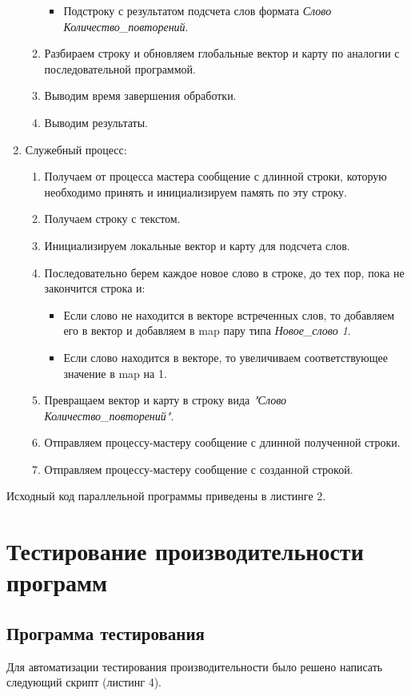 \documentclass[12pt,a4paper]{report}
\begin{document}
\begin{enumerate}
\begin{enumerate}
\begin{itemize}
										\item Подстроку с результатом подсчета слов формата \textit{Слово Количество\_повторений}.
									\end{itemize}
								\item Разбираем строку и обновляем глобальные вектор и карту по аналогии с последовательной программой.
								\item Выводим время завершения обработки.
								\item Выводим результаты.
							\end{enumerate}
						\item Служебный процесс:
							\begin{enumerate}
								\item Получаем от процесса мастера сообщение с длинной строки, которую необходимо принять и инициализируем память по эту строку.
								\item Получаем строку с текстом.
								\item Инициализируем локальные вектор и карту для подсчета слов.
								\item Последовательно берем каждое новое слово в строке, до тех пор, пока не закончится строка и:
									\begin{itemize}
										\item Если слово не находится в векторе встреченных слов, то добавляем его в вектор и добавляем в map пару типа \textit{Новое\_слово 1}.
										\item Если слово находится в векторе, то увеличиваем соответствующее значение в map на 1.
									\end{itemize}
								\item Превращаем вектор и карту в строку вида \textit{"Слово Количество\_повторений"}.
								\item Отправляем процессу-мастеру сообщение с длинной полученной строки.
								\item Отправляем процессу-мастеру сообщение с созданной строкой.
							\end{enumerate}
					\end{enumerate}
				
				Исходный код параллельной программы приведены в листинге 2.
				
		\section{Тестирование производительности программ}
			\subsection{Программа тестирования}
				Для автоматизации тестирования производительности было решено написать 
				следующий скрипт (листинг 4).
				
\end{document}
